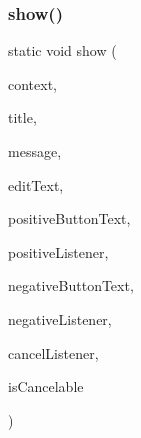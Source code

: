 \subsubsection{\texorpdfstring{show()}{show()}\hspace{0.1cm}{\footnotesize\ttfamily [2/2]}}
{\footnotesize\ttfamily static void show (\begin{DoxyParamCaption}\item[{@Non\+Null final Context}]{context,  }\item[{@Non\+Null final String}]{title,  }\item[{@Non\+Null final String}]{message,  }\item[{@Non\+Null final Edit\+Text}]{edit\+Text,  }\item[{@Nullable final String}]{positive\+Button\+Text,  }\item[{@Nullable final Dialog\+Interface.\+On\+Click\+Listener}]{positive\+Listener,  }\item[{@Nullable final String}]{negative\+Button\+Text,  }\item[{@Nullable final Dialog\+Interface.\+On\+Click\+Listener}]{negative\+Listener,  }\item[{@Nullable final Dialog\+Interface.\+On\+Cancel\+Listener}]{cancel\+Listener,  }\item[{final boolean}]{is\+Cancelable }\end{DoxyParamCaption})\hspace{0.3cm}{\ttfamily [static]}}


